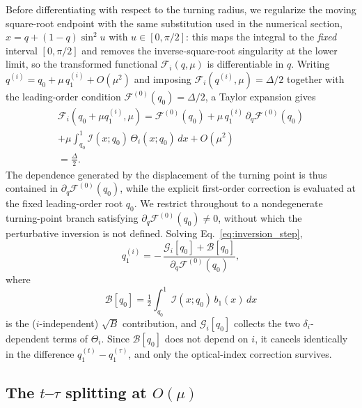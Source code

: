 \documentclass[
  aps,
  prd,
  twocolumn,
  nofootinbib,
  superscriptaddress,
  longbibliography
]{revtex4-2}
\begin{document}
Before differentiating with respect to the turning radius, we regularize
the moving square-root endpoint with the same substitution used in the
numerical section, $x=q+(1-q)\sin^2 u$ with $u\in[0,\pi/2]$: this maps
the integral to the \emph{fixed} interval $[0,\pi/2]$ and removes the
inverse-square-root singularity at the lower limit, so the transformed
functional $\mathcal{F}_i(q,\mu)$ is differentiable in $q$. Writing
$q^{(i)}=q_0+\mu\,q_1^{(i)}+O(\mu^2)$ and imposing
$\mathcal{F}_i(q^{(i)},\mu)=\Delta/2$ together with the leading-order
condition $\mathcal{F}^{(0)}(q_0)=\Delta/2$, a Taylor expansion gives
\begin{multline}
\mathcal{F}_i(q_0+\mu q_1^{(i)},\mu)
=
\mathcal{F}^{(0)}(q_0)
+\mu\,q_1^{(i)}\,\partial_q\mathcal{F}^{(0)}(q_0)
\\
+\mu\!\int_{q_0}^{1}\!\mathcal{I}(x;q_0)\,\Theta_i(x;q_0)\,dx
+O(\mu^2)
\\
=\frac{\Delta}{2}.
\label{eq:inversion_step}
\end{multline}
The dependence generated by the displacement of the turning point is
thus contained in $\partial_q\mathcal{F}^{(0)}(q_0)$, while the explicit
first-order correction is evaluated at the fixed leading-order root
$q_0$. We restrict throughout to a nondegenerate turning-point branch
satisfying $\partial_q\mathcal{F}^{(0)}(q_0)\ne0$, without which the
perturbative inversion is not defined. Solving
Eq.~\eqref{eq:inversion_step},
\begin{equation}
q_1^{(i)}
=
-\,
\frac{\mathcal{G}_i[q_0]+\mathcal{B}[q_0]}
{\partial_q\mathcal{F}^{(0)}(q_0)},
\label{eq:q1_general}
\end{equation}
where
\begin{equation}
\mathcal{B}[q_0]=\tfrac{1}{2}\!\int_{q_0}^{1}\!
\mathcal{I}(x;q_0)\,b_1(x)\,dx
\label{eq:B_functional}
\end{equation}
is the ($i$-independent) $\sqrt{B}$ contribution, and
$\mathcal{G}_i[q_0]$ collects the two $\delta_i$-dependent terms of
$\Theta_i$. Since $\mathcal{B}[q_0]$ does not depend on $i$, it cancels
identically in the difference $q_1^{(t)}-q_1^{(\tau)}$, and only the
optical-index correction survives.

\subsection{The $t$--$\tau$ splitting at $O(\mu)$}
\end{document}
